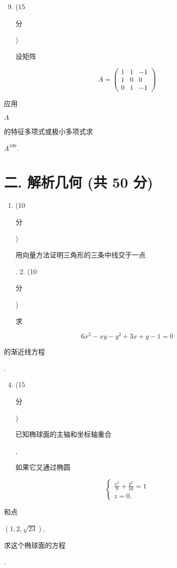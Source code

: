\documentclass[10pt]{article}
\begin{document}
\begin{enumerate}
  \setcounter{enumi}{8}
  \item (15 \begin{CJK}{UTF8}{mj}分\end{CJK}) \begin{CJK}{UTF8}{mj}设矩阵\end{CJK}
\end{enumerate}
$$
A=\left(\begin{array}{ccc}
1 & 1 & -1 \\
1 & 0 & 0 \\
0 & 1 & -1
\end{array}\right)
$$
\begin{CJK}{UTF8}{mj}应用\end{CJK} $A$ \begin{CJK}{UTF8}{mj}的特征多项式或极小多项式求\end{CJK} $A^{100}$.

\section{二. 解析几何 (共 50 分)}
\begin{enumerate}
  \item (10 \begin{CJK}{UTF8}{mj}分\end{CJK}) \begin{CJK}{UTF8}{mj}用向量方法证明三角形的三条中线交于一点\end{CJK}. 2. (10 \begin{CJK}{UTF8}{mj}分\end{CJK}) \begin{CJK}{UTF8}{mj}求\end{CJK}
\end{enumerate}
$$
6 x^{2}-x y-y^{2}+3 x+y-1=0
$$
\begin{CJK}{UTF8}{mj}的渐近线方程\end{CJK}.

\begin{enumerate}
  \setcounter{enumi}{3}
  \item (15 \begin{CJK}{UTF8}{mj}分\end{CJK}) \begin{CJK}{UTF8}{mj}已知椭球面的主轴和坐标轴重合\end{CJK}, \begin{CJK}{UTF8}{mj}如果它又通过椭圆\end{CJK}
\end{enumerate}
$$
\left\{\begin{array}{l}
\frac{x^{2}}{9}+\frac{y^{2}}{16}=1 \\
z=0 .
\end{array}\right.
$$
\begin{CJK}{UTF8}{mj}和点\end{CJK} $(1,2, \sqrt{23})$, \begin{CJK}{UTF8}{mj}求这个椭球面的方程\end{CJK}.
\end{document}
